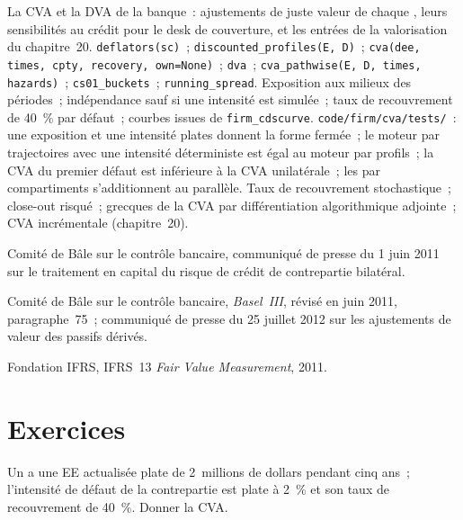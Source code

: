 \begin{build}
 La CVA et la DVA de la banque~: ajustements de juste valeur de chaque , leurs
sensibilités au crédit pour le desk de couverture, et les entrées de la valorisation du chapitre~20.
 \texttt{deflators(sc)}~; \texttt{discounted\_profiles(E, D)}~;
\texttt{cva(dee, times, cpty, recovery, own=None)}~; \texttt{dva}~; \texttt{cva\_pathwise(E, D,
times, hazards)}~; \texttt{cs01\_buckets}~; \texttt{running\_spread}.
 Exposition aux milieux des périodes~; indépendance sauf si une intensité est simulée~;
taux de recouvrement de 40~\% par défaut~; courbes issues de \texttt{firm\_cdscurve}.
 \texttt{code/firm/cva/tests/}~: une exposition et une intensité plates donnent la
forme fermée~; le moteur par trajectoires avec une intensité déterministe est égal au moteur par profils~;
la CVA du premier défaut est inférieure à la CVA unilatérale~; les  par compartiments s'additionnent au  parallèle.
 Taux de recouvrement stochastique~; close-out risqué~; grecques de la CVA par
différentiation algorithmique adjointe~; CVA incrémentale (chapitre~20).
\end{build}

\begin{omsources}
\item Comité de Bâle sur le contrôle bancaire, communiqué de presse du 1 juin 2011 sur le traitement en capital
du risque de crédit de contrepartie bilatéral.
\item Comité de Bâle sur le contrôle bancaire, \emph{Basel~III}, révisé en juin 2011,
paragraphe~75~; communiqué de presse du 25 juillet 2012 sur les ajustements de valeur des
passifs dérivés.
\item Fondation IFRS, IFRS~13 \emph{Fair Value Measurement}, 2011.
\end{omsources}

\section{Exercices}

\begin{exercise}[$\star$]\label{exo:rc:credit-and-debit-valuation-adjustments:1}
Un  a une EE actualisée plate de 2~millions de dollars pendant cinq ans~; l'intensité
de défaut de la contrepartie est plate à 2~\% et son taux de recouvrement de 40~\%. Donner la CVA.
\end{exercise}

